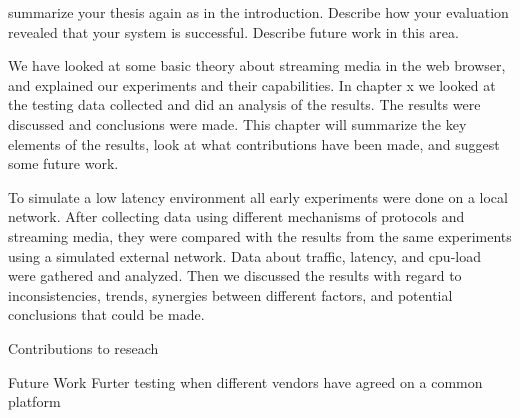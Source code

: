 
summarize your thesis again as in the introduction.
Describe how your evaluation revealed that your system is successful.
Describe future work in this area.

We have looked at some basic theory about streaming media in the web browser, and explained our experiments and their capabilities. In chapter x we looked at the testing data collected and did an analysis of the results. The results were discussed and conclusions were made. This chapter will summarize the key elements of the results, look at what contributions have been made, and suggest some future work.


To simulate a low latency environment all early experiments were done on a local network. After collecting data using different mechanisms of protocols and streaming media, they were compared with the results from the same experiments using a simulated external network. Data about traffic, latency, and cpu-load were gathered and analyzed. Then we discussed the results with regard to inconsistencies, trends, synergies between different factors, and potential conclusions that could be made.

Contributions to reseach

Future Work
Furter testing when different vendors have agreed on a common platform